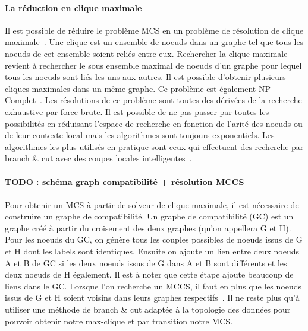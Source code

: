 \documentclass[12pt,french,twoside]{report}
\begin{document}
\paragraph{La réduction en clique maximale}
Il est possible de réduire le problème MCS en un problème de résolution de clique maximale~\cite{pelillo_matching_1999,grosso_simple_2008,rahman_small_2009}.
Une clique est un ensemble de noeuds dans un graphe tel que tous les noeuds de cet ensemble soient reliés entre eux.
Rechercher la clique maximale revient à rechercher le sous ensemble maximal de noeuds d'un graphe pour lequel tous les noeuds sont liés les uns aux autres.
Il est possible d'obtenir plusieurs cliques maximales dans un même graphe.
Ce problème est également NP-Complet~\cite{akkoyunlu_enumeration_1973}.
Les résolutions de ce problème sont toutes des dérivées de la recherche exhaustive par force brute.
Il est possible de ne pas passer par toutes les possibilités en réduisant l'espace de recherche en fonction de l'arité des noeuds ou de leur contexte local mais les algorithmes sont toujours exponentiels.
Les algorithmes les plus utilisés en pratique sont ceux qui effectuent des recherche par branch \& cut avec des coupes locales intelligentes~\cite{tomita_worst-case_2004}.

\paragraph{TODO : schéma graph compatibilité + résolution MCCS}

\paragraph{}Pour obtenir un MCS à partir de solveur de clique maximale, il est nécessaire de construire un graphe de compatibilité.
Un graphe de compatibilité (GC) est un graphe créé à partir du croisement des deux graphes (qu'on appellera G et H).
Pour les noeuds du GC, on génère tous les couples possibles de noeuds issus de G et H dont les labels sont identiques.
Ensuite on ajoute un lien entre deux noeuds A et B de GC si les deux noeuds issus de G dans A et B sont différents et les deux noeuds de H également.
Il est à noter que cette étape ajoute beaucoup de liens dans le GC.
Lorsque l'on recherche un MCCS, il faut en plus que les noeuds issus de G et H soient voisins dans leurs graphes respectifs~\cite{mccreesh_clique_2016}.
Il ne reste plus qu'à utiliser une méthode de branch \& cut adaptée à la topologie des données pour pouvoir obtenir notre max-clique et par transition notre MCS.
\end{document}
